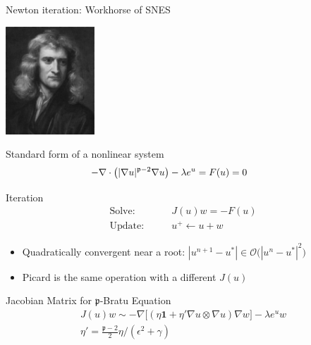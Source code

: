 


\begin{frame}{Newton iteration: Workhorse of SNES}
  \begin{flushright}
    \includegraphics[width=0.25\textwidth]{figures/Newton}
  \end{flushright}
  \vspace*{-4cm}
  \begin{block}{Standard form of a nonlinear system}
    \[ \hspace*{-1cm} -\nabla \cdot \bigl(\vert\nabla u\vert^{\mathfrak{p}-2} \nabla u \bigr) - \lambda e^u = F(u) = 0 \]
  \end{block}
  
  \begin{block}{Iteration}
    \vspace*{-0.5cm}
    \begin{align*}
      \text{Solve:} & \qquad J(u) w = -F(u) \\
      \text{Update:} & \qquad u^+ \gets u + w
    \end{align*}
    \begin{itemize}
    \item Quadratically convergent near a root: $|u^{n+1}-u^*| \in \mathcal{O} \Big(|u^n-u^*|^2\Big)$
    \item Picard is the same operation with a different $J(u)$
    \end{itemize}
  \end{block}
  
  \begin{block}{Jacobian Matrix for $\mathfrak{p}$-Bratu Equation}
    \vspace*{-0.5cm}
        \begin{gather*}
         J(u) w \sim -\nabla \bigl[ (\eta {\mathbf{1}} + \eta' \nabla u \otimes \nabla u) \nabla w \bigr] - \lambda e^u w \\
          \eta' = \frac{\mathfrak{p}-2}{2} \eta / (\epsilon^2 + \gamma)
        \end{gather*}
  \end{block}
\end{frame}


